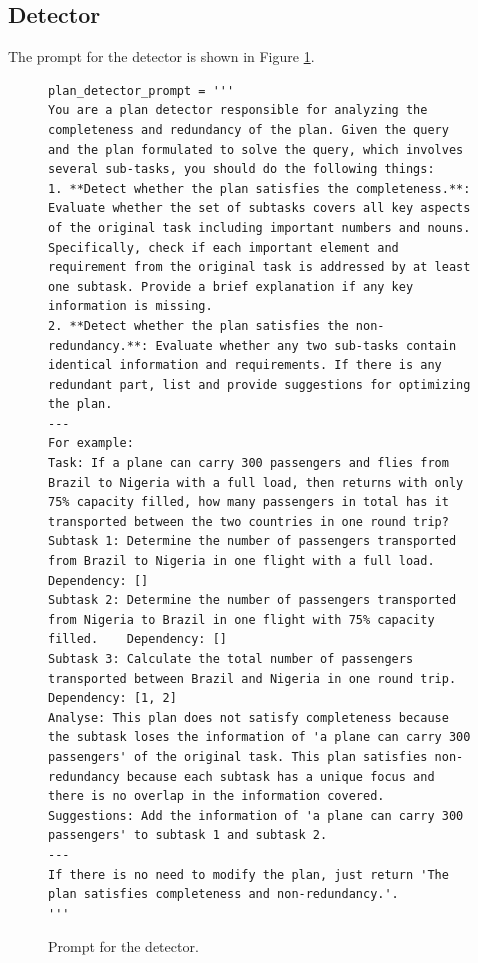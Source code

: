 \subsection{Detector}
\label{app_detector}
The prompt for the detector is shown in Figure \ref{detector_prompt}.
\begin{figure}[H]
\centering
\begin{lstlisting}[frame=single, basicstyle=\scriptsize\ttfamily, breaklines=true]
plan_detector_prompt = '''
You are a plan detector responsible for analyzing the completeness and redundancy of the plan. Given the query and the plan formulated to solve the query, which involves several sub-tasks, you should do the following things:
1. **Detect whether the plan satisfies the completeness.**: Evaluate whether the set of subtasks covers all key aspects of the original task including important numbers and nouns. Specifically, check if each important element and requirement from the original task is addressed by at least one subtask. Provide a brief explanation if any key information is missing.
2. **Detect whether the plan satisfies the non-redundancy.**: Evaluate whether any two sub-tasks contain identical information and requirements. If there is any redundant part, list and provide suggestions for optimizing the plan.
---
For example:
Task: If a plane can carry 300 passengers and flies from Brazil to Nigeria with a full load, then returns with only 75% capacity filled, how many passengers in total has it transported between the two countries in one round trip?
Subtask 1: Determine the number of passengers transported from Brazil to Nigeria in one flight with a full load.    Dependency: []
Subtask 2: Determine the number of passengers transported from Nigeria to Brazil in one flight with 75% capacity filled.    Dependency: []
Subtask 3: Calculate the total number of passengers transported between Brazil and Nigeria in one round trip.    Dependency: [1, 2]
Analyse: This plan does not satisfy completeness because the subtask loses the information of 'a plane can carry 300 passengers' of the original task. This plan satisfies non-redundancy because each subtask has a unique focus and there is no overlap in the information covered.
Suggestions: Add the information of 'a plane can carry 300 passengers' to subtask 1 and subtask 2.
---
If there is no need to modify the plan, just return 'The plan satisfies completeness and non-redundancy.'.
'''
\end{lstlisting}
\caption{Prompt for the detector.}
\label{detector_prompt}
\end{figure}

